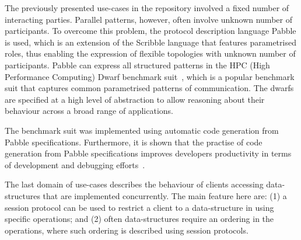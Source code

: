 The previously presented use-cases in the repository
involved a fixed number of interacting parties.
Parallel patterns, however, often involve unknown
number of participants.
To overcome this problem, the protocol description
language Pabble is used, which is an extension
of the Scribble language that features parametrised
roles, thus enabling the expression of flexible topologies
with unknown number of participants.
Pabble can express all structured patterns in the
HPC (High Performance Computing) Dwarf benchmark suit~\cite{BerkleyPar}, 
which is a popular benchmark suit that captures
common parametrised patterns of communication.
The dwarfs are specified at a high level of abstraction to
allow reasoning about their behaviour across a broad
range of applications.

The benchmark suit was implemented using automatic code generation
from Pabble specifications. Furthermore, it is shown that the practise
of code generation from Pabble specifications improves developers
productivity in terms of development and debugging efforts~\cite{NCY2015}.

The last domain of use-cases describes the behaviour of
clients accessing data-structures that are implemented
concurrently. The main feature here are:
(1) a session protocol can be used to restrict
a client to a data-structure in using specific operations; and
(2) often data-structures require an ordering in the
operations, where such ordering is described using session protocols.

